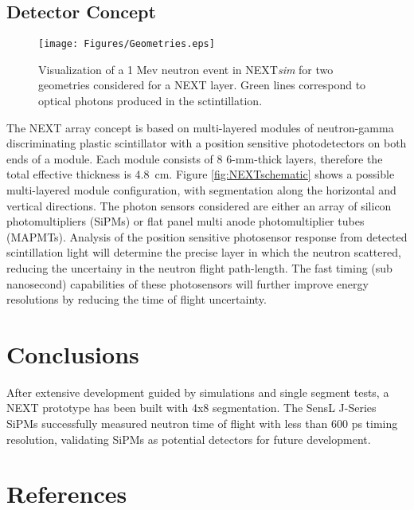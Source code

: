 \documentclass[preprint,3p,twocolumn]{elsarticle}
\begin{document}
\subsection{Detector Concept}
\begin{figure*}[htp]
 \centering
  \texttt{[image: Figures/Geometries.eps]}
  \caption{Visualization of a 1 Mev neutron event in NEXT\emph{sim} for two geometries considered for a NEXT layer. Green lines correspond to optical photons produced in the sctintillation.}
  \label{fig:Geometries}
\end{figure*} 


The NEXT array concept is based on multi-layered modules of neutron-gamma discriminating plastic scintillator with a position sensitive photodetectors on both ends of a module. Each module consists of 8 6-mm-thick layers, therefore the total effective thickness is 4.8~cm. Figure \ref{fig:NEXTschematic} shows a possible multi-layered module configuration, with segmentation along the horizontal and vertical directions. The photon sensors considered are either an array of silicon photomultipliers (SiPMs) or flat panel multi anode photomultiplier tubes (MAPMTs). Analysis of the position sensitive photosensor response from detected scintillation light will determine the precise layer in which the neutron scattered, reducing the uncertainy in the neutron flight path-length. The fast timing (sub nanosecond) capabilities of these photosensors will further improve energy resolutions by reducing the time of flight uncertainty. 





\section{Conclusions}
After extensive development guided by simulations and single segment tests, a NEXT prototype has been built with 4x8 segmentation. The SensL\textsuperscript{\texttrademark} J-Series SiPMs successfully measured neutron time of flight with less than 600 ps timing resolution, validating SiPMs as potential detectors for future development.

\section*{References}
%

\end{document}
